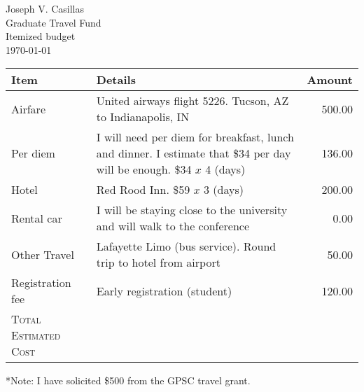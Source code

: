 \documentclass[12pt,landscape]{article}
\begin{document}
\noindent Joseph V. Casillas \\
Graduate Travel Fund \\
Itemized budget \\
\today \\



	\begin{center}
	\begin{tabular}{@{}lp{5.5in}r@{}}
		\toprule
		Item 				& Details & Amount \\
		\midrule
		Airfare				& United airways flight 5226. Tucson, AZ to Indianapolis, IN                    & 500.00 \\
		Per diem			& I will need per diem for breakfast, lunch and dinner. I estimate that \$34 per day will be enough. \$34 $x$ 4 (days) & 136.00 \\
		Hotel				& Red Rood Inn. \$59 $x$ 3 (days)                                               & 200.00 \\
		Rental car			& I will be staying close to the university and will walk to the conference     & 0.00 \\
		Other Travel        & Lafayette Limo (bus service). Round trip to hotel from airport                & 50.00 \\
		Registration fee	& Early registration (student)                                                  & 120.00 \\
		\textsc{Total Estimated Cost}	&         & \fbox{1006.00}\\
		\bottomrule                
	\end{tabular}
	\end{center}
	
	*Note: I have solicited \$500 from the GPSC travel grant. 
\end{document}
